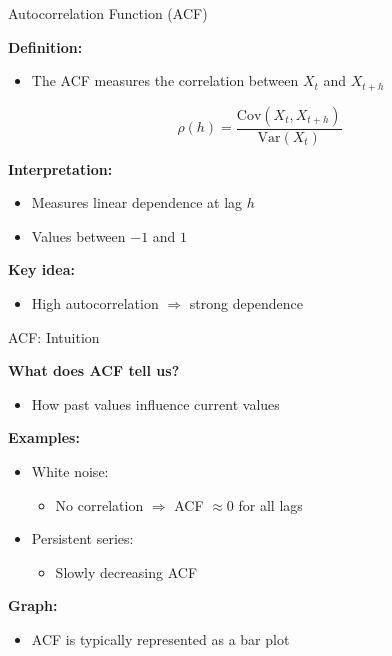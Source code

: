 \documentclass[aspectratio=169]{beamer}
\begin{document}
\begin{frame}{Autocorrelation Function (ACF)}

\textbf{Definition:}
\begin{itemize}
    \item The ACF measures the correlation between $X_t$ and $X_{t+h}$
\end{itemize}

\vspace{0.3cm}

\[
\rho(h) = \frac{\mathrm{Cov}(X_t, X_{t+h})}{\mathrm{Var}(X_t)}
\]

\vspace{0.4cm}

\textbf{Interpretation:}
\begin{itemize}
    \item Measures linear dependence at lag $h$
    \item Values between $-1$ and $1$
\end{itemize}

\vspace{0.4cm}

\textbf{Key idea:}
\begin{itemize}
    \item High autocorrelation $\Rightarrow$ strong dependence
\end{itemize}

\end{frame}

\begin{frame}{ACF: Intuition}

\textbf{What does ACF tell us?}

\begin{itemize}
    \item How past values influence current values
\end{itemize}

\vspace{0.4cm}

\textbf{Examples:}
\begin{itemize}
    \item White noise:
    \begin{itemize}
        \item No correlation $\Rightarrow$ ACF $\approx 0$ for all lags
    \end{itemize}
    
    \vspace{0.2cm}
    
    \item Persistent series:
    \begin{itemize}
        \item Slowly decreasing ACF
    \end{itemize}
\end{itemize}

\vspace{0.4cm}

\textbf{Graph:}
\begin{itemize}
    \item ACF is typically represented as a bar plot
\end{itemize}

\end{frame}
\end{document}

